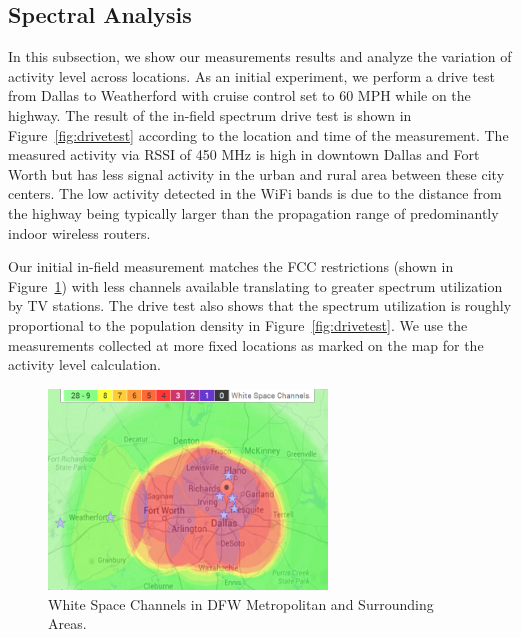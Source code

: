 \subsection{Spectral Analysis} 
\label{subsec:measurementresult}
In this subsection, we show our measurements results and analyze the variation of activity level across locations.
As an initial experiment, we perform a drive test from Dallas to Weatherford with cruise control set to 60 MPH while 
on the highway. The result of the in-field spectrum drive test is shown in Figure~\ref{fig:drivetest} according to 
the location and time of the measurement. The measured activity via RSSI of 450 MHz is high in downtown Dallas and 
Fort Worth but has less signal activity in the urban and rural area between these city centers. The low activity 
detected in the WiFi bands is due to the distance from the highway being typically larger than the propagation range 
of predominantly indoor wireless routers.

Our initial in-field measurement matches the FCC restrictions (shown in Figure~\ref{fig:drivemap}) with less channels 
available translating to greater spectrum utilization by TV stations. The drive test also shows that the spectrum 
utilization is roughly proportional to the population density in Figure~\ref{fig:drivetest}. We use the measurements 
collected at more fixed locations as marked on the map for the activity level calculation. 

\begin{figure}
\centering
\includegraphics[width=74mm]{figures/drivemap}
\vspace{-0.1in}
\caption{White Space Channels in DFW Metropolitan and Surrounding Areas.}                                                                 
\label{fig:drivemap}
\vspace{-0.1in}
\end{figure}
   
